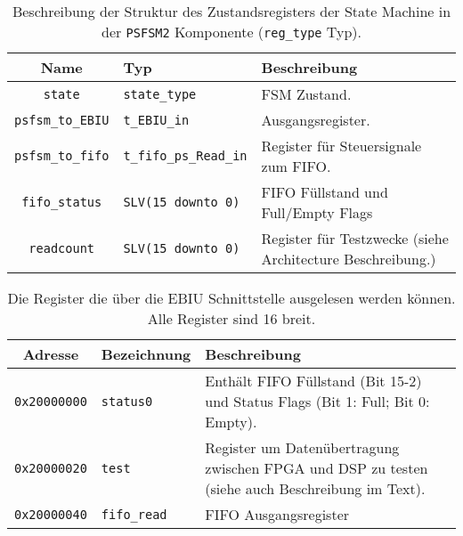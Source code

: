 \begin{table}[htbp]
    \ttabbox
    {
        \caption[Typdefinition PSFSM2 Zustandsregister]{Beschreibung der Struktur des Zustandsregisters der State Machine in der \lstinline$PSFSM2$ Komponente (\lstinline$reg_type$ Typ).}
        \label{Tab_reg_typ}
    }
    {
    \begin{tabular}{c  p{2cm} p{6cm}}
        \toprule
        Name				        & Typ						        & Beschreibung \\
        \midrule
        \lstinline$state$		    & \lstinline$state_type$	        & \gls{FSM} Zustand.\\
        \lstinline$psfsm_to_EBIU$	& \lstinline$t_EBIU_in$	            &  Ausgangsregister.\\
        \lstinline$psfsm_to_fifo$   & \lstinline$t_fifo_ps_Read_in$     & Register für Steuersignale zum FIFO.\\
        \lstinline$fifo_status$     & \lstinline$SLV(15 downto 0)$      & FIFO Füllstand und Full/Empty Flags\\
	    \lstinline$readcount$       & \lstinline$SLV(15 downto 0)$      & Register für Testzwecke (siehe Architecture Beschreibung.)\\
        \bottomrule
    \end{tabular}
}
\end{table}

\begin{table}[htbp]
    \ttabbox
    {
        \caption[Memory Map Rohdatenschnittstelle]{Die Register die über die EBIU Schnittstelle ausgelesen werden können. Alle Register sind \SI{16}{\bit} breit.}
        \label{Tab_RohdatenMemMap}
    }
    {
    \begin{tabular}{c  l p{6cm}}
        \toprule
        Adresse				    & Bezeichnung			& Beschreibung \\
        \midrule
        \lstinline$0x20000000$  & \lstinline$status0$   & Enthält FIFO Füllstand (Bit 15-2) und Status Flags (Bit 1: Full; Bit 0: Empty).\\
        \lstinline$0x20000020$  & \lstinline$test$      & Register um Datenübertragung zwischen FPGA und DSP zu testen (siehe auch Beschreibung im Text).\\
	    \lstinline$0x20000040$  & \lstinline$fifo_read$ & FIFO Ausgangsregister\\
        \bottomrule
    \end{tabular}
}
\end{table}

